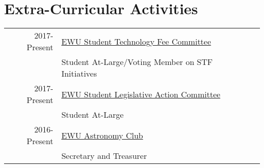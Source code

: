 \documentclass[]{deedy-resume-openfont}
\begin{document}
\begin{minipage}[t]{0.66\textwidth}
\begin{tabular}{rll}
\end{tabular}
\sectionsep


\section{Extra-Curricular Activities} 
\begin{tabular}{rll}
2017-Present & \underline{EWU Student Technology Fee Committee}\\
 & Student At-Large/Voting Member on STF Initiatives\\
2017-Present & \underline{EWU Student Legislative Action Committee}\\
 & Student At-Large\\
2016-Present & \underline{EWU Astronomy Club} \\
 & Secretary and Treasurer\\

\end{tabular}
\sectionsep

\end{minipage} 
\end{document}
